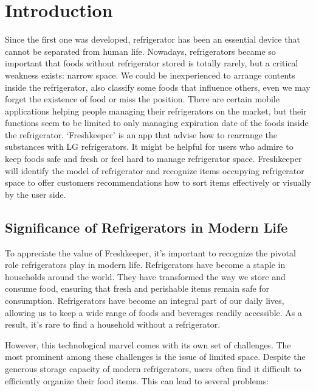\documentclass[conference]{IEEEtran}
\begin{document}
\section{Introduction}
Since the first one was developed, refrigerator has been an essential device that cannot be separated from human life. Nowadays, refrigerators became so important that foods without refrigerator stored is totally rarely, but a critical weakness exists: narrow space.
We could be inexperienced to arrange contents inside the refrigerator, also classify some foods that influence others, even we may forget the existence of food or miss the position.
There are certain mobile applications helping people managing their refrigerators on the market, but their functions seem to be limited to only managing expiration date of the foods inside the refrigerator. 
‘Freshkeeper’ is an app that advise how to rearrange the substances with LG refrigerators. It might be helpful for users who admire to keep foods safe and fresh or feel hard to manage refrigerator space. Freshkeeper will identify the model of refrigerator and recognize items occupying refrigerator space to offer customers recommendations how to sort items effectively or visually by the user side.



\subsection{Significance of Refrigerators in Modern Life}
    
To appreciate the value of Freshkeeper, it's important to recognize the pivotal role refrigerators play in modern life. Refrigerators have become a staple in households around the world. They have transformed the way we store and consume food, ensuring that fresh and perishable items remain safe for consumption. Refrigerators have become an integral part of our daily lives, allowing us to keep a wide range of foods and beverages readily accessible. As a result, it's rare to find a household without a refrigerator.

However, this technological marvel comes with its own set of challenges. The most prominent among these challenges is the issue of limited space. Despite the generous storage capacity of modern refrigerators, users often find it difficult to efficiently organize their food items. This can lead to several problems:
\end{document}
